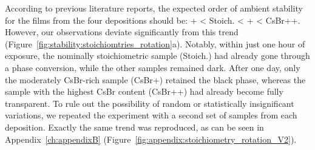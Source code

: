 According to previous literature reports, the expected order of ambient stability for the films from the four depositions should be: + < Stoich. < + < CsBr++. However, our observations deviate significantly from this trend (Figure~\ref{fig:stability:stoichiomtries_rotation}a). Notably, within just one hour of exposure, the nominally stoichiometric sample (Stoich.) had already gone through a phase conversion, while the other samples remained dark. After one day, only the moderately CsBr-rich sample (CsBr+) retained the black phase, whereas the sample with the highest CsBr content (CsBr++) had already become fully transparent. To rule out the possibility of random or statistically insignificant variations, we repeated the experiment with a second set of samples from each deposition. Exactly the same trend was reproduced, as can be seen in Appendix~\ref{ch:appendixB}
(Figure~\ref{fig:appendix:stoichiometry_rotation_V2}).


